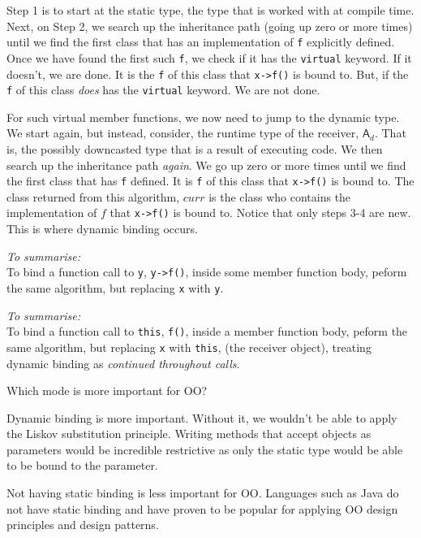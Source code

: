 Step 1 is to start at the static type, the type that is worked with at compile time. 
Next, on Step 2, we search up the inheritance path (going up zero or more times) 
until we find the first class that has an implementation of \lstinline{f} explicitly defined. 
Once we have found the first such \lstinline{f}, we check if it has the \lstinline{virtual} keyword. If it doesn't,
we are done. It is the \lstinline{f} of this class that \lstinline{x->f()} is bound to.
But, if the \lstinline{f} of this class \textit{does} has the \lstinline{virtual} keyword. We are not done.

For such virtual member functions, we now need to jump to the dynamic type. 
We start again, but instead, consider, the runtime type of the receiver, $\textsf{A}_{d }$.
That is, the possibly downcasted type that is a result of 
executing code. We then search up the inheritance path \textit{again}.
We go up zero or more times until we find the first class that has \lstinline{f}  defined. 
It is \lstinline{f} of this class that \lstinline{x->f()} is bound to.
The class returned from this algorithm, $curr$ is the class who contains the 
implementation of $f$ that \lstinline{x->f()} is bound to.
Notice that only steps 3-4 are new. This is where dynamic binding occurs. 

\frmrule

\textit{To summarise:} \\
To bind a function call to \lstinline{y}, \lstinline{y->f()}, inside some member function body, 
peform the same algorithm, but replacing \lstinline{x} with \lstinline{y}.


\frmrule

\textit{To summarise:}\\
To bind a function call to \lstinline{this}, \lstinline{f()}, inside a member function body, 
peform the same algorithm, but replacing \lstinline{x} with \lstinline{this}, (the 
receiver object), treating dynamic binding as \textit{continued throughout calls}. 








\frmrule

\begin{example}
Which mode is more important for OO? 

Dynamic binding is more important. Without it, we wouldn't be able 
to apply the Liskov substitution principle. Writing methods 
that accept objects as parameters would be incredible restrictive 
as only the static type would be able to be bound to the parameter. 

Not having static binding is less important for OO. Languages 
such as Java do not have static binding and have proven to be popular 
for applying OO design principles and design patterns. 
\end{example} 

